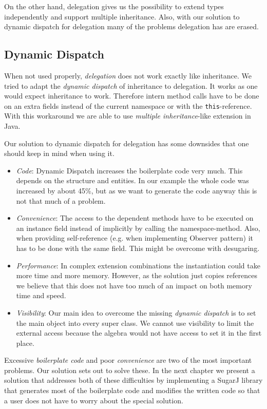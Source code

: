 \documentclass{report}
\begin{document}
On the other hand, delegation gives us the possibility to extend types independently and support multiple inheritance. Also, with our solution to dynamic dispatch for delegation many of the problems delegation has are erased.

\subsection{Dynamic Dispatch}
\label{discussionDynamicDispatch}

When not used properly, \emph{delegation} does not work exactly like inheritance. We tried to adapt the \emph{dynamic dispatch} of inheritance to delegation. It works as one would expect inheritance to work. Therefore intern method calls have to be done on an extra fields instead of the current namespace or with the \lstinline{this}-reference. With this workaround we are able to use \emph{multiple inheritance}-like extension in Java.

Our solution to dynamic dispatch for delegation has some downsides that one should keep in mind when using it.
\begin{itemize}
  \item \emph{Code}: Dynamic Dispatch increases the boilerplate code very much. This depends on the structure and entities. In our example the whole code was increased by about 45\%, but as we want to generate the code anyway this is not that much of a problem.
  \item \emph{Convenience}: The access to the dependent methods have to be executed on an instance field instead of implicitly by calling the namespace-method. Also, when providing self-reference (e.g. when implementing Observer pattern\cite{Gof-Design-1993}) it has to be done with the same field. This might be overcome with desugaring.
  \item \emph{Performance}: In complex extension combinations the instantiation could take more time and more memory. However, as the solution just copies references we believe that this does not have too much of an impact on both memory time and speed.
  \item \emph{Visibility}: Our main idea to overcome the missing \emph{dynamic dispatch} is to set the main object into every super class. We cannot use visibility to limit the external access because the algebra would not have access to set it in the first place.
\end{itemize}

Excessive \emph{boilerplate code} and poor \emph{convenience} are two of the most important problems. Our solution sets out to solve these. In the next chapter we present a solution that addresses both of these difficulties by implementing a SugarJ library that generates most of the boilerplate code and modifies the written code so that a user does not have to worry about the special solution.
\end{document}
